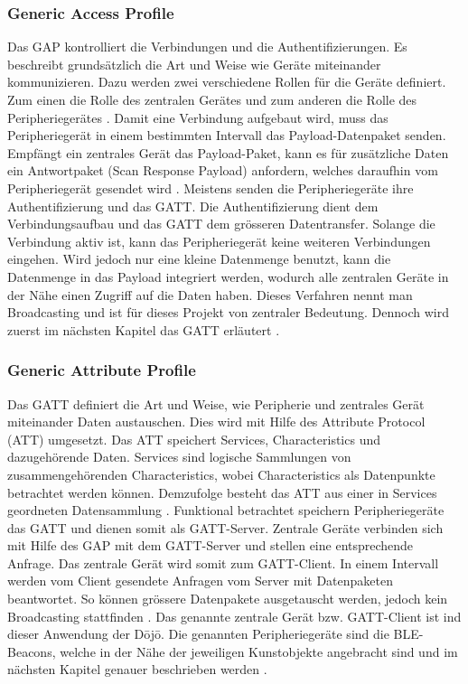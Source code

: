 \subsubsection{Generic Access Profile}
Das GAP kontrolliert die Verbindungen und die Authentifizierungen. Es beschreibt grundsätzlich die Art und Weise wie Geräte miteinander kommunizieren. Dazu werden zwei verschiedene Rollen für die Geräte definiert. Zum einen die Rolle des zentralen Gerätes und zum anderen die Rolle des Peripheriegerätes \cite{7_Teildokument_BT}. Damit eine Verbindung aufgebaut wird, muss das Peripheriegerät in einem bestimmten Intervall das Payload-Datenpaket senden. Empfängt ein zentrales Gerät das Payload-Paket, kann es für zusätzliche Daten ein Antwortpaket (Scan Response Payload) anfordern, welches daraufhin vom Peripheriegerät gesendet wird \cite{7_Teildokument_BT}. Meistens senden die Peripheriegeräte ihre Authentifizierung und das GATT. Die Authentifizierung dient dem Verbindungsaufbau und das GATT dem grösseren Datentransfer. Solange die Verbindung aktiv ist, kann das Peripheriegerät keine weiteren Verbindungen eingehen. Wird jedoch nur eine kleine Datenmenge benutzt, kann die Datenmenge in das Payload integriert werden, wodurch alle zentralen Geräte in der Nähe einen Zugriff auf die Daten haben. Dieses Verfahren nennt man Broadcasting und ist für dieses Projekt von zentraler Bedeutung. Dennoch wird zuerst im nächsten Kapitel das GATT erläutert \cite{7_Teildokument_BT}.

\subsubsection{Generic Attribute Profile}
Das GATT definiert die Art und Weise, wie Peripherie und zentrales Gerät miteinander Daten austauschen. Dies wird mit Hilfe des Attribute Protocol (ATT) \cite{8_Teildokument_BT} umgesetzt. Das ATT speichert Services, Characteristics und dazugehörende Daten. Services sind logische Sammlungen von zusammengehörenden Characteristics, wobei Characteristics als Datenpunkte betrachtet werden können. Demzufolge besteht das ATT aus einer in Services geordneten Datensammlung \cite{8_Teildokument_BT}. Funktional betrachtet speichern Peripheriegeräte das GATT und dienen somit als GATT-Server. Zentrale Geräte verbinden sich mit Hilfe des GAP mit dem GATT-Server und stellen eine entsprechende Anfrage. Das zentrale Gerät wird somit zum GATT-Client. In einem Intervall werden vom Client gesendete Anfragen vom Server mit Datenpaketen beantwortet. So können grössere Datenpakete ausgetauscht werden, jedoch kein Broadcasting stattfinden \cite{8_Teildokument_BT}. Das genannte zentrale Gerät bzw. GATT-Client ist ind dieser Anwendung der Dōjō. Die genannten Peripheriegeräte sind die BLE-Beacons, welche in der Nähe der jeweiligen Kunstobjekte angebracht sind und im nächsten Kapitel genauer beschrieben werden \cite{8_Teildokument_BT}.

